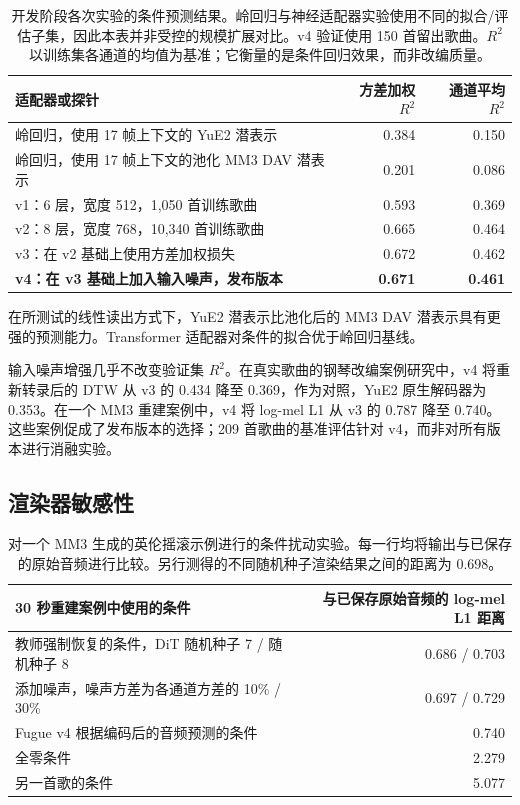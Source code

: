 \documentclass[11pt,a4paper,fontset=fandol]{ctexart}
\begin{document}
\begin{table}[htbp]
    \centering
    \caption{开发阶段各次实验的条件预测结果。岭回归与神经适配器实验使用不同的拟合/评估子集，因此本表并非受控的规模扩展对比。v4 验证使用 150 首留出歌曲。$R^2$ 以训练集各通道的均值为基准；它衡量的是条件回归效果，而非改编质量。}
    \label{tab:learned}
    \small
    \begin{tabular}{lrr}
        \toprule
        适配器或探针 & 方差加权 $R^2$ & 通道平均 $R^2$ \\
        \midrule
        岭回归，使用 17 帧上下文的 YuE2 潜表示 & 0.384 & 0.150 \\
        岭回归，使用 17 帧上下文的池化 MM3 DAV 潜表示 & 0.201 & 0.086 \\
        v1：6 层，宽度 512，1,050 首训练歌曲 & 0.593 & 0.369 \\
        v2：8 层，宽度 768，10,340 首训练歌曲 & 0.665 & 0.464 \\
        v3：在 v2 基础上使用方差加权损失 & 0.672 & 0.462 \\
        \textbf{v4：在 v3 基础上加入输入噪声，发布版本} & \textbf{0.671} & \textbf{0.461} \\
        \bottomrule
    \end{tabular}
\end{table}

在所测试的线性读出方式下，YuE2 潜表示比池化后的 MM3 DAV 潜表示具有更强的预测能力。Transformer 适配器对条件的拟合优于岭回归基线。

输入噪声增强几乎不改变验证集 $R^2$。在真实歌曲的钢琴改编案例研究中，v4 将重新转录后的 DTW 从 v3 的 0.434 降至 0.369，作为对照，YuE2 原生解码器为 0.353。在一个 MM3 重建案例中，v4 将 log-mel L1 从 v3 的 0.787 降至 0.740。这些案例促成了发布版本的选择；209 首歌曲的基准评估针对 v4，而非对所有版本进行消融实验。

\subsection{渲染器敏感性}

\begin{table}[htbp]
    \centering
    \caption{对一个 MM3 生成的英伦摇滚示例进行的条件扰动实验。每一行均将输出与已保存的原始音频进行比较。另行测得的不同随机种子渲染结果之间的距离为 0.698。}
    \label{tab:sensitivity}
    \small
    \begin{tabular}{lr}
        \toprule
        30 秒重建案例中使用的条件 & 与已保存原始音频的 log-mel L1 距离 \\
        \midrule
        教师强制恢复的条件，DiT 随机种子 7 / 随机种子 8 & 0.686 / 0.703 \\
        添加噪声，噪声方差为各通道方差的 10\% / 30\% & 0.697 / 0.729 \\
        Fugue v4 根据编码后的音频预测的条件 & 0.740 \\
        全零条件 & 2.279 \\
        另一首歌的条件 & 5.077 \\
        \bottomrule
    \end{tabular}
\end{table}
\end{document}
